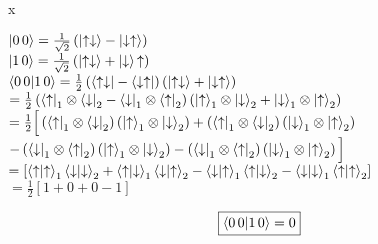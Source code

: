 x\documentclass[12pt]{article}
\begin{document}
$\ket{0 \, 0} = \frac{1}{\sqrt{2}}\left(\ket{\uparrow\downarrow} - \ket{\downarrow\uparrow}\right)$\vspace{0.5em}\\
$\ket{1 \, 0} = \frac{1}{\sqrt{2}}\left(\ket{\uparrow\downarrow} + \ket{\downarrow}{\uparrow}\right)$\vspace{1.5em}\\
$\braket{0 \, 0}{1 \, 0} = \frac{1}{2} \left(\bra{\uparrow\downarrow} - \bra{\downarrow\uparrow}\right)\left(\ket{\uparrow \downarrow} + \ket{\downarrow\uparrow}\right)$\vspace{0.5em}\\
\hspace*{3.4em} $= \frac{1}{2}\left(\bra{\uparrow}_1 \otimes \bra{\downarrow}_2 - \bra{\downarrow}_1 \otimes \bra{\uparrow}_2\right)\left(\ket{\uparrow}_1 \otimes \ket{\downarrow}_2 + \ket{\downarrow}_1 \otimes \ket{\uparrow}_2\right)$\vspace{0.5em}\\
\hspace*{3.4em} $= \frac{1}{2}\Big[\left(\bra{\uparrow}_1 \otimes \bra{\downarrow}_2\right)\left(\ket{\uparrow}_1 \otimes \ket{\downarrow}_2\right) + \left(\bra{\uparrow}_1 \otimes \bra{\downarrow}_2\right)\left(\ket{\downarrow}_1 \otimes \ket{\uparrow}_2\right)$\vspace{0.5em}\\
\hspace*{5.4em} $ - \left(\bra{\downarrow}_1 \otimes \bra{\uparrow}_2\right)\left(\ket{\uparrow}_1 \otimes \ket{\downarrow}_2\right) - \left(\bra{\downarrow}_1 \otimes \bra{\uparrow}_2\right)\left(\ket{\downarrow}_1 \otimes \ket{\uparrow}_2\right)\Big]$\vspace{0.5em}\\ 
\hspace*{3.4em} $= \left[\braket{\uparrow}{\uparrow}_1\braket{\downarrow}{\downarrow}_2 + \braket{\uparrow}{\downarrow}_1\braket{\downarrow}{\uparrow}_2 - \braket{\downarrow}{\uparrow}_1\braket{\uparrow}{\downarrow}_2 - \braket{\downarrow}{\downarrow}_1\braket{\uparrow}{\uparrow}_2 \right]$\vspace{0.5em}\\ 
\hspace*{3.4em} $ = \frac{1}{2}\left[1 + 0 + 0 -1\right]$

\[\boxed{\braket{0 \,  0}{1 \, 0} = 0}\]

\newpage
\end{document}
